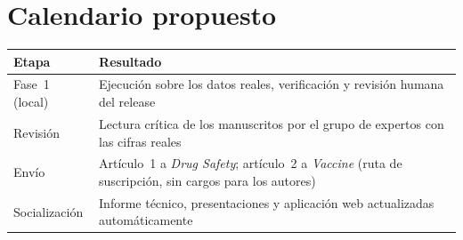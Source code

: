 \documentclass[11pt]{article}
\begin{document}
\section*{Calendario propuesto}
\noindent
\begin{tabularx}{\linewidth}{@{}>{\raggedright\arraybackslash}p{3.2cm}Y@{}}
\toprule
Etapa & Resultado\\
\midrule
Fase~1 (local) & Ejecución sobre los datos reales, verificación y revisión humana del release\\
Revisión & Lectura crítica de los manuscritos por el grupo de expertos con las cifras reales\\
Envío & Artículo~1 a \emph{Drug Safety}; artículo~2 a \emph{Vaccine} (ruta de suscripción, sin
  cargos para los autores)\\
Socialización & Informe técnico, presentaciones y aplicación web actualizadas automáticamente\\
\bottomrule
\end{tabularx}

\medskip
{}
\end{document}
